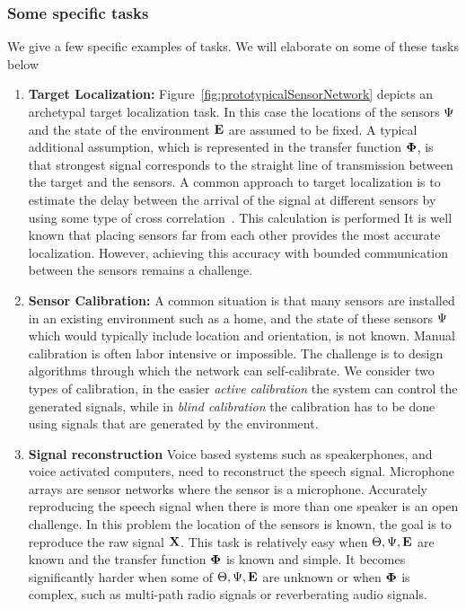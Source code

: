 \subsubsection*{Some specific tasks}
We give a few specific examples of tasks. We will elaborate on some of these tasks below
\begin{enumerate}
    \item {\bf Target Localization:}
      Figure~\ref{fig:prototypicalSensorNetwork} depicts an archetypal
      target localization task. In this case the locations of the
      sensors $\Psi$ and the state of the environment $\mathbf{E}$ are
      assumed to be fixed. A typical additional assumption, which is
      represented in the transfer function $\mathbf{\Phi}$, is that
      strongest signal corresponds to the straight line of
      transmission between the target and the sensors. A common
      approach to target localization is to estimate the delay between
      the arrival of the signal at different sensors by using some
      type of cross correlation~\cite{}. This calculation is performed  
      It is well known that placing sensors far from each other
      provides the most accurate localization. However, achieving this
      accuracy with bounded communication between the sensors remains
      a challenge.

    \item{\bf Sensor Calibration:} A common situation is that many sensors
      are installed in an existing environment such as a home, and
      the state of these sensors $\Psi$ which would typically
      include location and orientation, is not known. Manual
      calibration is often labor intensive or impossible. The
      challenge is to design algorithms through which the network can
      self-calibrate. We consider two types of calibration, in the
      easier {\em active calibration} the system can control the generated
      signals, while in {\em blind calibration} the calibration has to
      be done using signals that are generated by the environment. 
      
    \item {\bf Signal reconstruction} Voice based systems such as
      speakerphones, and voice activated computers, need to
      reconstruct the speech signal. Microphone arrays are sensor
      networks where the sensor is a microphone. Accurately
      reproducing the speech signal when there is more than one
      speaker is an open challenge. In this problem the location of
      the sensors is known, the goal is to reproduce the raw signal
      $\mathbf{X}$. This task is relatively easy when
      $\Theta,\Psi,\mathbf{E}$ are known and the transfer function
      $\mathbf{\Phi}$ is known and simple. It becomes significantly harder
      when some of $\Theta,\Psi,\mathbf{E}$ are unknown or when
      $\mathbf{\Phi}$ is complex, such as multi-path radio signals or
      reverberating audio signals.
    

\end{enumerate}
